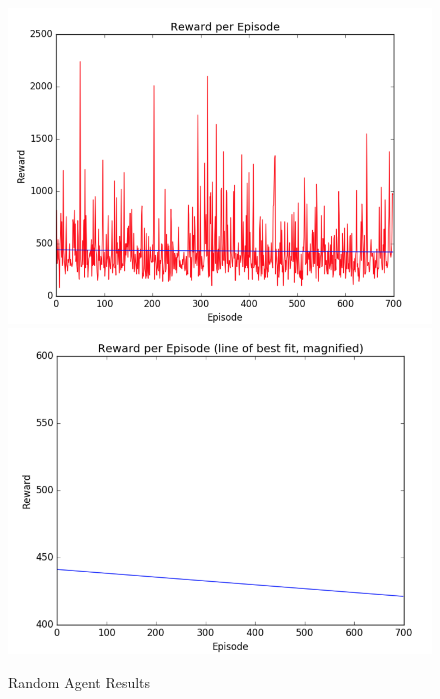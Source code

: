 \documentclass[paper=a4, fontsize=11pt]{scrartcl} %
\numberwithin{equation}{section} %
\numberwithin{figure}{section} %
\numberwithin{table}{section} %
\begin{document}
\begin{figure}[h]
\includegraphics[scale=0.20]{reward_random}
\includegraphics[scale=0.20]{reward_random_line_of_best_fit}
\centering
\caption{Random Agent Results}
\end{figure}
\end{document}
